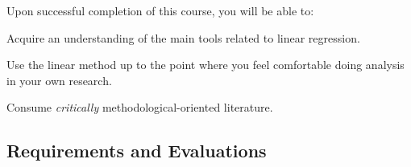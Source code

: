 \documentclass[letterpaper]{article}
\renewenvironment{itemize}{
  \begin{list}{}{
    \setlength{\leftmargin}{1.5em}
  }
}{
  \end{list}
}
\begin{document}
Upon successful completion of this course, you will be able to:

\begin{itemize}
	\item[$\bullet$] Acquire an understanding of the main tools related to linear regression.
	\item[$\bullet$] Use the linear method up to the point where you feel comfortable doing analysis in your own research.
	\item[$\bullet$] Consume \emph{critically} methodological-oriented literature.
\end{itemize}






\subsection*{Requirements and Evaluations}
\end{document}
